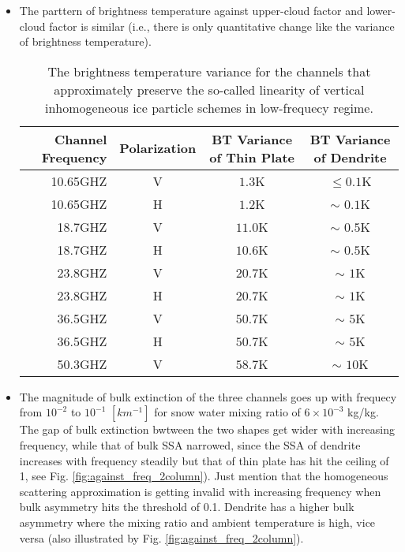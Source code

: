 \begin{itemize}
    \item The parttern of brightness temperature against upper-cloud factor and lower-cloud factor is similar (i.e., there is only quantitative change
like the variance of brightness temperature).

    \begin{table}[htbp]
        \caption{The brightness temperature variance for the channels that approximately preserve the
        so-called linearity of vertical inhomogeneous ice particle schemes in low-frequecy regime.}
        \label{tab:brightnessvariance}
        \centering
        \addtolength{\tabcolsep}{-0mm}
        \begin{tabular}{rccc}
            \toprule[0.75pt]	
            Channel Frequency &  Polarization & BT Variance of Thin Plate & BT Variance of Dendrite \\
            \midrule[0.5pt]	    
            10.65GHZ & V & $1.3$K & $\le 0.1$K \\ 
            10.65GHZ & H & $1.2$K & $\sim$ $0.1$K \\
            18.7GHZ & V & $11.0$K & $\sim$ $0.5$K \\ 
            18.7GHZ & H & $10.6$K & $\sim$ $0.5$K \\
            23.8GHZ & V & $20.7$K & $\sim$ $1$K \\ 
            23.8GHZ & H & $20.7$K & $\sim$ $1$K \\
            36.5GHZ & V & $50.7$K & $\sim$ $5$K \\ 
            36.5GHZ & H & $50.7$K & $\sim$ $5$K \\
            50.3GHZ & V & $58.7$K & $\sim$ $10$K \\  
            \bottomrule[0.75pt]
        \end{tabular}
    \end{table}

    \item The magnitude of bulk extinction of the three channels goes up with frequecy from $10^{-2}$ to $10^{-1}$ $[km^{-1}]$ 
for snow water mixing ratio of $6 \times 10^{-3}$ kg/kg. The gap of bulk extinction bwtween the two shapes get wider with increasing frequency,
while that of bulk SSA narrowed, since the SSA of dendrite increases with frequency steadily but that of thin plate has hit the ceiling of 1, 
see Fig. \ref{fig:against_freq_2column}). Just mention that the homogeneous scattering approximation is getting invalid 
with increasing frequency when bulk asymmetry hits the threshold of 0.1. 
Dendrite has a higher bulk asymmetry where the mixing ratio and ambient temperature is high, vice versa
(also illustrated by Fig. \ref{fig:against_freq_2column}).
\end{itemize}

